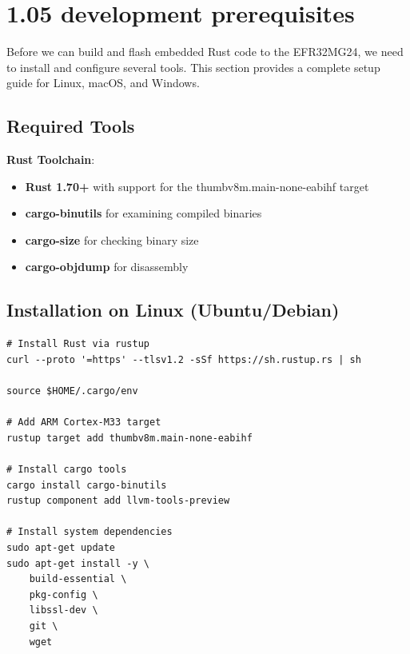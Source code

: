 \section{1.05 development prerequisites}
\label{sec:1.05 development prerequisites}


Before we can build and flash embedded Rust code to the EFR32MG24, we need to install and configure several tools. This section provides a complete setup guide for Linux, macOS, and Windows.

\subsection{Required Tools}
\label{sec:required-tools}

\textbf{Rust Toolchain}:

\begin{itemize}
    \item \textbf{Rust 1.70+} with support for the thumbv8m.main-none-eabihf target
    \item \textbf{cargo-binutils} for examining compiled binaries
    \item \textbf{cargo-size} for checking binary size
    \item \textbf{cargo-objdump} for disassembly
\end{itemize}
\subsection{Installation on Linux (Ubuntu/Debian)}
\label{subsec:install-linux}
\begin{verbatim}
# Install Rust via rustup
curl --proto '=https' --tlsv1.2 -sSf https://sh.rustup.rs | sh

source $HOME/.cargo/env

# Add ARM Cortex-M33 target
rustup target add thumbv8m.main-none-eabihf

# Install cargo tools
cargo install cargo-binutils
rustup component add llvm-tools-preview

# Install system dependencies
sudo apt-get update
sudo apt-get install -y \
    build-essential \
    pkg-config \
    libssl-dev \
    git \
    wget
\end{verbatim}
